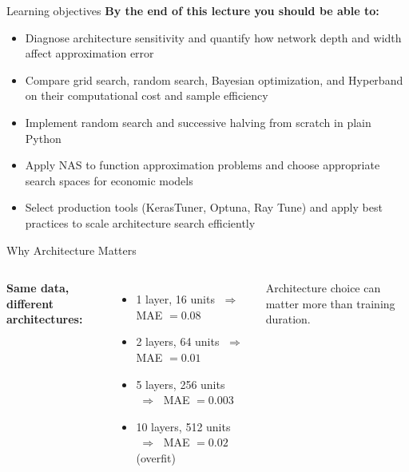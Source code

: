 \documentclass[aspectratio=169,11pt]{beamer}
\newcommand{\emphc}[1]{\textcolor{harvardcrimson}{#1}}
\begin{document}
\begin{frame}{Learning objectives}
\textbf{By the end of this lecture you should be able to:}
\begin{itemize}
  \item Diagnose architecture sensitivity and quantify how network depth and width affect approximation error
  \item Compare grid search, random search, Bayesian optimization, and Hyperband on their computational cost and sample efficiency
  \item Implement random search and successive halving from scratch in plain Python
  \item Apply NAS to function approximation problems and choose appropriate search spaces for economic models
  \item Select production tools (KerasTuner, Optuna, Ray Tune) and apply best practices to scale architecture search efficiently
\end{itemize}
\end{frame}



\begin{frame}{Why Architecture Matters}
\begin{columns}[T]
\textbf{Same data, different architectures:}
\vspace{0.3cm}
\begin{itemize}
    \item 1 layer, 16 units $\;\Rightarrow\;$ MAE $= 0.08$
    \item 2 layers, 64 units $\;\Rightarrow\;$ MAE $= 0.01$
    \item 5 layers, 256 units $\;\Rightarrow\;$ MAE $= 0.003$
    \item 10 layers, 512 units $\;\Rightarrow\;$ MAE $= 0.02$ (overfit)
\end{itemize}
\vspace{0.3cm}
Architecture choice can matter \emphc{more than training duration}.

\end{columns}
\end{frame}
\end{document}
